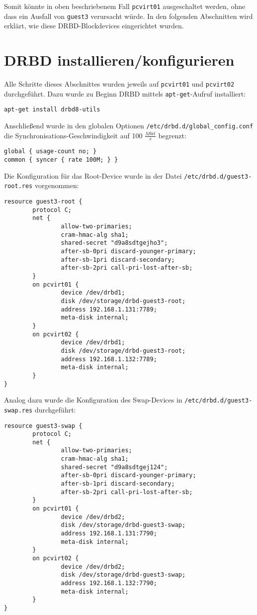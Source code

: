 Somit könnte in oben beschriebenem Fall \verb#pcvirt01# ausgeschaltet werden, ohne dass ein Ausfall von \verb#guest3# verursacht würde. In den folgenden Abschnitten wird erklärt, wie diese DRBD-Blockdevices eingerichtet wurden.

\section{DRBD installieren/konfigurieren}
Alle Schritte dieses Abschnittes wurden jeweils auf \verb#pcvirt01# und \verb#pcvirt02# durchgeführt. Dazu wurde zu Beginn DRBD mittels \verb#apt-get#-Aufruf installiert:
\setupVerbatimOut
\begin{verbatim}
apt-get install drbd8-utils
\end{verbatim}

Anschließend wurde in den globalen Optionen \verb|/etc/drbd.d/global_config.conf| die Synchronisations-Geschwindigkeit auf 100 $\frac{Mbit}{s}$ begrenzt:
\setupVerbatimOut
\begin{verbatim}
global { usage-count no; }
common { syncer { rate 100M; } }
\end{verbatim}

Die Konfiguration für das Root-Device wurde in der Datei \verb|/etc/drbd.d/guest3-root.res| vorgenommen:
\setupVerbatimOut
\begin{verbatim}
resource guest3-root {
        protocol C;
        net {
                allow-two-primaries;
                cram-hmac-alg sha1;
                shared-secret "d9a8sdtgejho3";
                after-sb-0pri discard-younger-primary;
                after-sb-1pri discard-secondary;
                after-sb-2pri call-pri-lost-after-sb;
        }
        on pcvirt01 {
                device /dev/drbd1;
                disk /dev/storage/drbd-guest3-root;
                address 192.168.1.131:7789;
                meta-disk internal;
        }
        on pcvirt02 {
                device /dev/drbd1;
                disk /dev/storage/drbd-guest3-root;
                address 192.168.1.132:7789;
                meta-disk internal;
        }
}
\end{verbatim}

Analog dazu wurde die Konfiguration des Swap-Devices in \verb|/etc/drbd.d/guest3-swap.res| durchgeführt:
\setupVerbatimOut
\begin{verbatim}
resource guest3-swap {
        protocol C;
        net {
                allow-two-primaries;
                cram-hmac-alg sha1;
                shared-secret "d9a8sdtgej124";
                after-sb-0pri discard-younger-primary;
                after-sb-1pri discard-secondary;
                after-sb-2pri call-pri-lost-after-sb;
        }
        on pcvirt01 {
                device /dev/drbd2;
                disk /dev/storage/drbd-guest3-swap;
                address 192.168.1.131:7790;
                meta-disk internal;
        }
        on pcvirt02 {
                device /dev/drbd2;
                disk /dev/storage/drbd-guest3-swap;
                address 192.168.1.132:7790;
                meta-disk internal;
        }
}
\end{verbatim}


